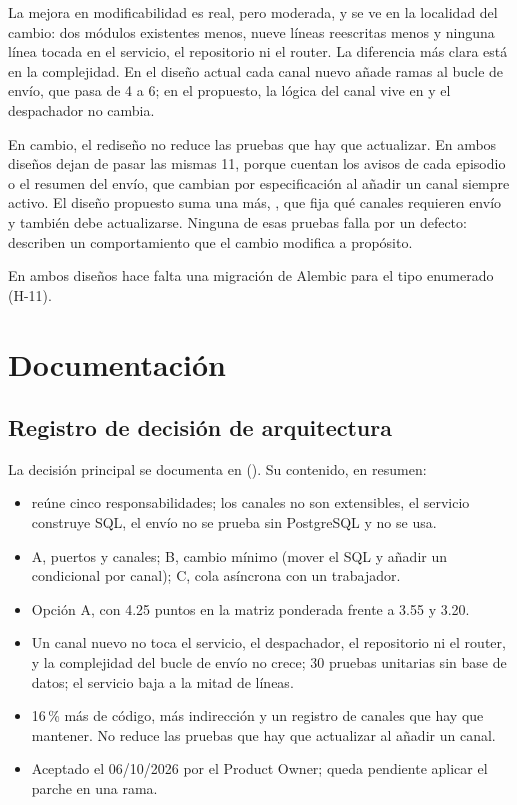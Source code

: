 \documentclass[11pt,a4paper]{article}
\begin{document}
 La mejora en modificabilidad es real, pero moderada, y se ve en la localidad del cambio: dos módulos existentes menos, nueve líneas reescritas menos y ninguna línea tocada en el servicio, el repositorio ni el router. La diferencia más clara está en la complejidad. En el diseño actual cada canal nuevo añade ramas al bucle de envío, que pasa de 4 a 6; en el propuesto, la lógica del canal vive en  y el despachador no cambia.

En cambio, el rediseño no reduce las pruebas que hay que actualizar. En ambos diseños dejan de pasar las mismas 11, porque cuentan los avisos de cada episodio o el resumen del envío, que cambian por especificación al añadir un canal siempre activo. El diseño propuesto suma una más, , que fija qué canales requieren envío y también debe actualizarse. Ninguna de esas pruebas falla por un defecto: describen un comportamiento que el cambio modifica a propósito.

 En ambos diseños hace falta una migración de Alembic para el tipo enumerado  (H-11).

\section{Documentación}

\subsection{Registro de decisión de arquitectura}

La decisión principal se documenta en  (). Su contenido, en resumen:

\begin{itemize}
  \item {}  reúne cinco responsabilidades; los canales no son extensibles, el servicio construye SQL, el envío no se prueba sin PostgreSQL y  no se usa.
  \item {} A, puertos y canales; B, cambio mínimo (mover el SQL y añadir un condicional por canal); C, cola asíncrona con un trabajador.
  \item {} Opción A, con 4.25 puntos en la matriz ponderada frente a 3.55 y 3.20.
  \item {} Un canal nuevo no toca el servicio, el despachador, el repositorio ni el router, y la complejidad del bucle de envío no crece; 30 pruebas unitarias sin base de datos; el servicio baja a la mitad de líneas.
  \item {} 16\,\% más de código, más indirección y un registro de canales que hay que mantener. No reduce las pruebas que hay que actualizar al añadir un canal.
  \item {} Aceptado el 06/10/2026 por el Product Owner; queda pendiente aplicar el parche en una rama.
\end{itemize}
\end{document}
